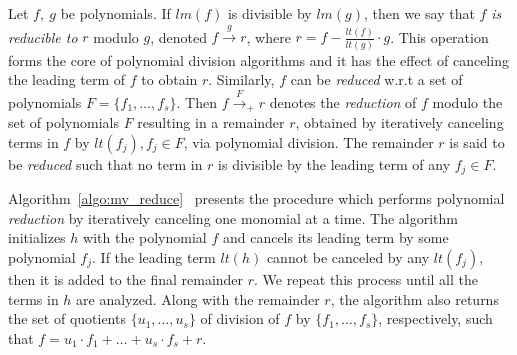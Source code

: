 
Let $f,~g$ be polynomials. If
$lm(f)$ is divisible by $lm(g)$, then we say that $f$ {\it is
reducible to} $r$ modulo $g$, denoted $f
\stackrel{g}{\textstyle\longrightarrow} r$, where $r = f - \frac{lt(f)}{lt(g)} 
\cdot g$. This operation forms the core  of polynomial
division algorithms and it has the effect of canceling the 
leading term of $f$ to obtain $r$. Similarly, 
$f$ can be {\it reduced} w.r.t a set of polynomials $F=\{f_1,\dots,f_s\}$. 
Then $f\xrightarrow{F}_+r$ denotes the {\it
  reduction} of $f$ modulo the set of polynomials $F$ resulting in a
remainder $r$, obtained by iteratively canceling terms in $f$ by
$lt(f_j), f_j\in F$, via polynomial division. 
 The remainder $r$ is said to be {\it reduced} such that no term in $r$ is
divisible by the leading term of any $f_j \in F$.

Algorithm~\ref{algo:mv_reduce}~\cite{gb_book} presents the procedure which
performs polynomial {\it reduction} by iteratively canceling
one monomial at a time.
The algorithm initializes $h$ with the polynomial $f$ and cancels its
leading term by some polynomial $f_j$. If the leading term $lt(h)$
cannot be canceled by any $lt(f_j)$, then it is added to the final
remainder $r$. We repeat this process until all the terms in $h$
are analyzed.  
Along with the remainder $r$, the algorithm also returns
the set of quotients $\{u_1,\dots,u_s\}$ of division of $f$ by
$\{f_1,\dots,f_s\}$, respectively, such that $f = u_1\cdot
f_1+\dots+u_s\cdot f_s + r$.

